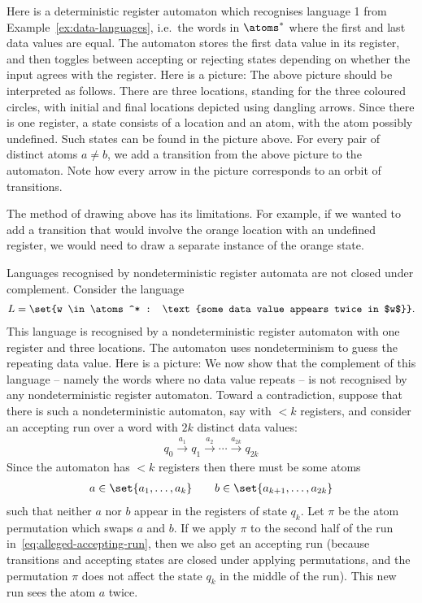 \begin{myexample}
Here is a deterministic register automaton which recognises language 1 from Example~\ref{ex:data-languages}, i.e.~the words in $\atoms^*$ where the first and last data values are equal. The automaton stores the first data value in its register, and then toggles between accepting or rejecting states depending on whether the input agrees with the register. Here is a picture: 
The above picture should be interpreted as follows. There are three locations, standing for the three coloured circles, with initial and final locations depicted using dangling arrows. Since there is one register, a state consists of a location and an atom, with the atom possibly undefined. Such states can be found in the picture above. For every pair of distinct atoms $a \neq b$, we add a transition from the above picture to the automaton. Note how every arrow in the picture corresponds to an orbit of transitions.

The method of drawing above has its limitations. For example, if we wanted to add a transition that would involve the orange location with an undefined register, we would need to draw a separate instance of the orange state. 
\end{myexample}


\begin{myexample}\label{ex:no-complement}
	Languages recognised by nondeterministic register automata are not closed under complement. Consider the language 
	\begin{align*}
		L = \set{w \in \atoms^* : \text{some data value appears twice in $w$}}.
	\end{align*} 
	This language is recognised by a nondeterministic register automaton with one register and three locations. The automaton uses nondeterminism to guess the repeating data value. Here is a picture:
	We now show that the complement of this language -- namely the words where no data value repeats -- is not recognised by any nondeterministic register automaton. Toward a contradiction, suppose that there is such a nondeterministic automaton, say with $<k$ registers, and consider an accepting run over a word with $2k$ distinct data values:
	\begin{align}\label{eq:alleged-accepting-run}
	q_0 \stackrel {a_1} \to q_1 \stackrel {a_2} \to \cdots \stackrel {a_{2k}} \to q_{2k}
	\end{align}
	Since the automaton has $<k$ registers then there must be some atoms
	\begin{align*}
		a \in \set{a_1,\ldots,a_k} \qquad b \in \set{a_{k+1},\ldots,a_{2k}}
	\end{align*}
	such that neither $a$ nor $b$ appear in the registers of state $q_k$. Let $\pi$ be the atom permutation which swaps $a$ and $b$. If we apply $\pi$ to the second half of the run in~\eqref{eq:alleged-accepting-run}, then we also get an accepting run (because transitions and accepting states are closed under applying permutations, and the permutation $\pi$ does not affect the state $q_k$ in the middle of the run). This new run sees the atom $a$ twice.
\end{myexample}
\exercisepart

